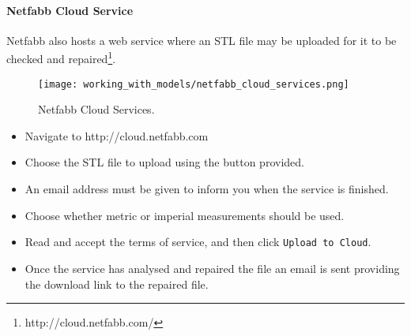 \paragraph{Netfabb Cloud Service} %
\label{par:netfabb_cloud_service}
Netfabb also hosts a web service where an STL file may be uploaded for it to be checked and repaired\footnote{http://cloud.netfabb.com/}.  

\begin{figure}[H]
\centering
\texttt{[image: working\_with\_models/netfabb\_cloud\_services.png]}
\caption{Netfabb Cloud Services.}
\label{fig:netfabb_cloud_services}
\end{figure}

\begin{itemize}
	\item Navigate to http://cloud.netfabb.com
	\item Choose the STL file to upload using the button provided.
	\item An email address must be given to inform you when the service is finished.
	\item Choose whether metric or imperial measurements should be used.
	\item Read and accept the terms of service, and then click \texttt{Upload to Cloud}.
	\item Once the service has analysed and repaired the file an email is sent providing the download link to the repaired file.
\end{itemize}
